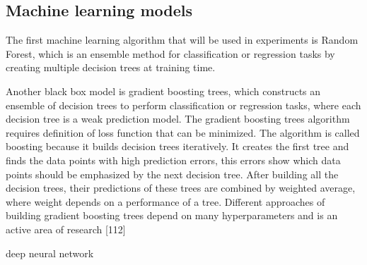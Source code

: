 \subsection{Machine learning models}

The first machine learning algorithm that will be used in experiments is Random Forest, which is an ensemble method for classification or regression tasks by creating multiple decision trees at training time. 

Another black box model is gradient boosting trees, which constructs an ensemble of decision trees to perform classification or regression tasks, where each decision tree is a weak prediction model. 
The gradient boosting trees algorithm requires definition of loss function that can be minimized. The algorithm is called boosting because it builds decision trees iteratively. It creates the first tree and finds the data points with high prediction errors, this errors show which data points should be emphasized by the next decision tree. After building all the decision trees, their predictions of these trees are combined by weighted average, where weight depends on a performance of a tree. Different approaches of building gradient boosting trees depend on many hyperparameters and is an active area of research [112]


deep neural network

